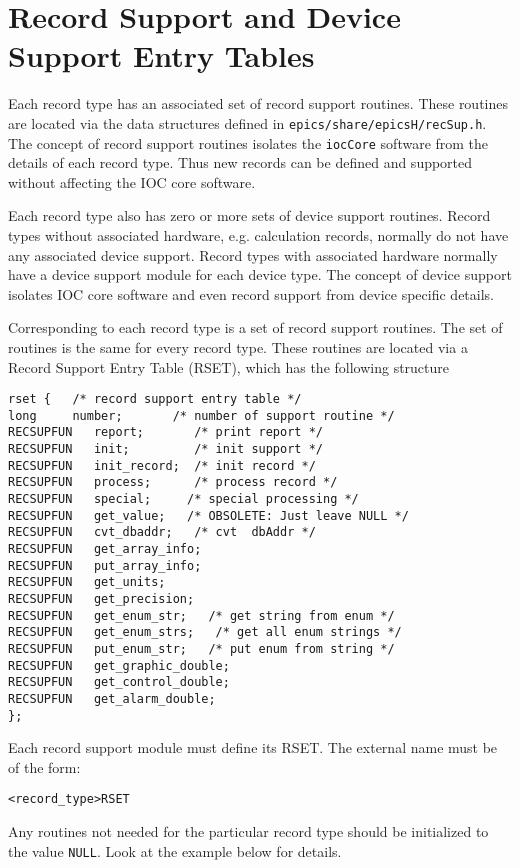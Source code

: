 \section{Record Support and Device Support Entry Tables}

Each record type has an associated set of record support routines. These routines are located via the data structures 
defined in \verb|epics/share/epicsH/recSup.h|. The concept of record support routines isolates the \verb|iocCore| software 
from the details of each record type. Thus new records can be defined and supported without affecting the IOC core 
software.

Each record type also has zero or more sets of device support routines. Record types without associated hardware, e.g. 
calculation records, normally do not have any associated device support. Record types with associated hardware normally 
have a  device support module for each device type. The concept of device support isolates IOC core software and even 
record support from device specific details.

Corresponding to each record type is a set of record support routines. The set of routines is the same for every record type. 
These routines are located via a Record Support Entry Table (RSET), which has the following structure

\begin{verbatim}rset {   /* record support entry table */
long     number;       /* number of support routine */
RECSUPFUN   report;       /* print report */
RECSUPFUN   init;         /* init support */
RECSUPFUN   init_record;  /* init record */
RECSUPFUN   process;      /* process record */
RECSUPFUN   special;     /* special processing */
RECSUPFUN   get_value;   /* OBSOLETE: Just leave NULL */
RECSUPFUN   cvt_dbaddr;   /* cvt  dbAddr */
RECSUPFUN   get_array_info;
RECSUPFUN   put_array_info;
RECSUPFUN   get_units;
RECSUPFUN   get_precision;
RECSUPFUN   get_enum_str;   /* get string from enum */
RECSUPFUN   get_enum_strs;   /* get all enum strings */
RECSUPFUN   put_enum_str;   /* put enum from string */
RECSUPFUN   get_graphic_double;
RECSUPFUN   get_control_double;
RECSUPFUN   get_alarm_double;
};
\end{verbatim}Each record support module must define its RSET. The external name must be of the form:

\begin{verbatim}<record_type>RSET
\end{verbatim}Any routines not needed for the particular record type should be initialized to the value \verb|NULL|. Look at the example below 
for details.

